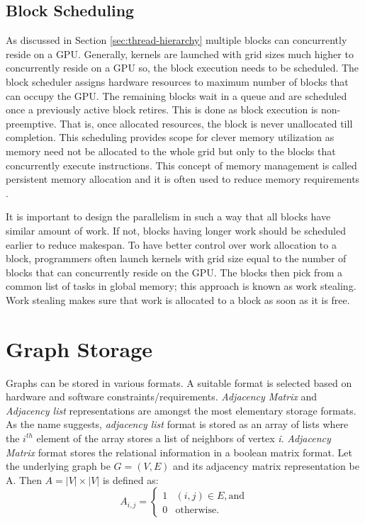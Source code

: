 \subsection{Block Scheduling}\label{sec:block-scheduling}
As discussed in Section \ref{sec:thread-hierarchy} multiple blocks can concurrently reside on a GPU.
Generally, kernels are launched with grid sizes much higher to concurrently reside on a GPU so, the block execution needs to be scheduled.
The block scheduler assigns hardware resources to maximum number of blocks that can occupy the GPU. The remaining blocks wait in a queue and are scheduled once a previously active block retires.
This is done as block execution is non-preemptive. That is, once allocated resources, the block is never unallocated till completion.
This scheduling provides scope for clever memory utilization as memory need not be allocated to the whole grid but only to the blocks that concurrently execute instructions.
This concept of memory management is called persistent memory allocation and it is often used to reduce memory requirements \cite{persistent-memory}.

It is important to design the parallelism in such a way that all blocks have %
similar amount of work.
If not, blocks having longer work should be scheduled earlier to reduce makespan.
To have better control over work allocation to a block, programmers often launch kernels with grid size equal to the number of blocks that can concurrently reside on the GPU.
The blocks then pick from a common list of tasks in global memory; this approach is known as work stealing.
Work stealing makes sure that work is allocated to a block as soon as it is free.


\section{Graph Storage}\label{storage-format}
Graphs can be stored in various formats. A suitable format is selected based on hardware and software constraints/requirements.
\textit{Adjacency Matrix} and \textit{Adjacency list} representations are amongst the most elementary storage formats.
As the name suggests, \textit{adjacency list} format is stored as an array of lists where the $i^{th}$ element of the array stores a list of neighbors of vertex \textit{i}.
\textit{Adjacency Matrix} format stores the relational information in a boolean matrix format.
Let the underlying graph be $G=(V,E)$ and its adjacency matrix representation be A.
Then $A = |V|\times|V|$ is defined as:
$$
    A_{i,j}=\begin{cases}
        1 & (i,j) \in E, \text{and} \\
        0 & \text{otherwise.}
    \end{cases}
$$

